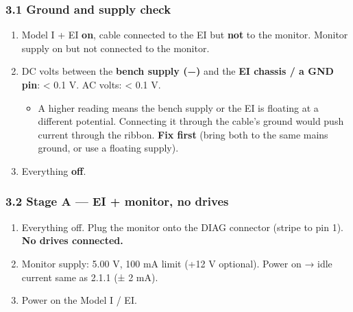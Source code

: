 \documentclass[
  10pt,
  twoside]{article}
\providecommand{\tightlist}{%
  \setlength{\itemsep}{0pt}\setlength{\parskip}{0pt}}
\begin{document}
\hypertarget{ground-and-supply-check}{%
\subsubsection{3.1 Ground and supply
check}\label{ground-and-supply-check}}

\begin{enumerate}
\def\labelenumi{\arabic{enumi}.}
\tightlist
\item
  Model I + EI \textbf{on}, cable connected to the EI but
  \textbf{not} to the monitor. Monitor supply on but not
  connected to the monitor.
\item
  DC volts between the \textbf{bench supply (−)} and the
  \textbf{EI chassis / a GND pin}: \textless{} 0.1 V. AC
  volts: \textless{} 0.1 V.

  \begin{itemize}
  \tightlist
  \item
    A higher reading means the bench supply or the EI is
    floating at a different potential. Connecting it through
    the cable's ground would push current through the
    ribbon. \textbf{Fix first} (bring both to the same mains
    ground, or use a floating supply).
  \end{itemize}
\item
  Everything \textbf{off}.
\end{enumerate}

\hypertarget{stage-a-ei-monitor-no-drives}{%
\subsubsection{3.2 Stage A --- EI + monitor, no
drives}\label{stage-a-ei-monitor-no-drives}}

\begin{enumerate}
\def\labelenumi{\arabic{enumi}.}
\tightlist
\item
  Everything off. Plug the monitor onto the DIAG connector
  (stripe to pin 1). \textbf{No drives connected.}
\item
  Monitor supply: 5.00 V, 100 mA limit (+12 V optional).
  Power on → idle current same as 2.1.1 (± 2 mA).
\item
  Power on the Model I / EI.
\end{enumerate}
\end{document}
